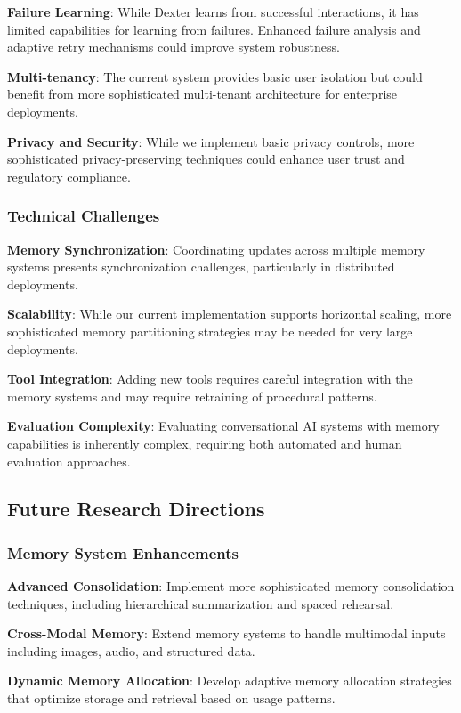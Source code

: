 \documentclass[11pt]{article}
\begin{document}
\textbf{Failure Learning}: While Dexter learns from successful interactions, it has limited capabilities for learning from failures. Enhanced failure analysis and adaptive retry mechanisms could improve system robustness.

\textbf{Multi-tenancy}: The current system provides basic user isolation but could benefit from more sophisticated multi-tenant architecture for enterprise deployments.

\textbf{Privacy and Security}: While we implement basic privacy controls, more sophisticated privacy-preserving techniques could enhance user trust and regulatory compliance.

\subsubsection{Technical Challenges}

\textbf{Memory Synchronization}: Coordinating updates across multiple memory systems presents synchronization challenges, particularly in distributed deployments.

\textbf{Scalability}: While our current implementation supports horizontal scaling, more sophisticated memory partitioning strategies may be needed for very large deployments.

\textbf{Tool Integration}: Adding new tools requires careful integration with the memory systems and may require retraining of procedural patterns.

\textbf{Evaluation Complexity}: Evaluating conversational AI systems with memory capabilities is inherently complex, requiring both automated and human evaluation approaches.

\subsection{Future Research Directions}

\subsubsection{Memory System Enhancements}

\textbf{Advanced Consolidation}: Implement more sophisticated memory consolidation techniques, including hierarchical summarization and spaced rehearsal.

\textbf{Cross-Modal Memory}: Extend memory systems to handle multimodal inputs including images, audio, and structured data.

\textbf{Dynamic Memory Allocation}: Develop adaptive memory allocation strategies that optimize storage and retrieval based on usage patterns.
\end{document}
